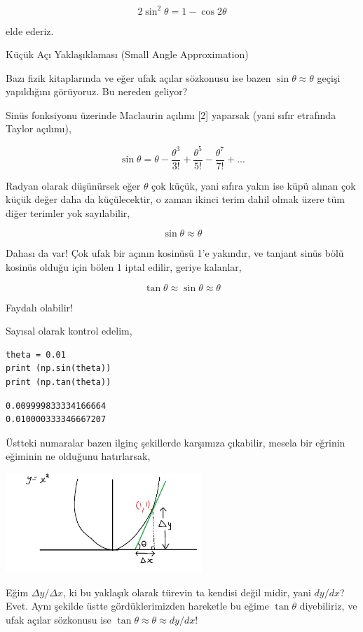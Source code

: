 \documentclass[12pt,fleqn]{article}\usepackage{../../common}
\begin{document}
$$
2\sin^2\theta = 1 - \cos2\theta
$$

elde ederiz.

Küçük Açı Yaklaşıklaması (Small Angle Approximation)

Bazı fizik kitaplarında ve eğer ufak açılar sözkonusu ise bazen $\sin\theta
\approx \theta$ geçişi yapıldığını görüyoruz. Bu nereden geliyor?

Sinüs fonksiyonu üzerinde Maclaurin açılımı [2] yaparsak (yani sıfır etrafında
Taylor açılımı),

$$
\sin\theta =
\theta -
\frac{\theta^3}{3!} +
\frac{\theta^5}{5!} -
\frac{\theta^7}{7!} + ...
$$

Radyan olarak düşünürsek eğer $\theta$ çok küçük, yani sıfıra yakın ise küpü
alınan çok küçük değer daha da küçülecektir, o zaman ikinci terim dahil olmak
üzere tüm diğer terimler yok sayılabilir,

$$
\sin\theta \approx \theta
$$

Dahası da var! Çok ufak bir açının kosinüsü 1'e yakındır, ve tanjant sinüs bölü
kosinüs olduğu için bölen 1 iptal edilir, geriye kalanlar,

$$
\tan\theta \approx \sin\theta \approx \theta
$$

Faydalı olabilir!

Sayısal olarak kontrol edelim,

\begin{verbatim}
theta = 0.01
print (np.sin(theta))
print (np.tan(theta))
\end{verbatim}

\begin{verbatim}
0.009999833334166664
0.010000333346667207
\end{verbatim}

Üstteki numaralar bazen ilginç şekillerde karşımıza çıkabilir, mesela bir
eğrinin eğiminin ne olduğunu hatırlarsak,

\includegraphics[width=20em]{ode_mattuck_50_trig_03.png}

Eğim $\Delta y / \Delta x$, ki bu yaklaşık olarak türevin ta kendisi değil
midir, yani $dy / dx$? Evet. Aynı şekilde üstte gördüklerimizden hareketle
bu eğime $\tan\theta$ diyebiliriz, ve ufak açılar sözkonusu ise
$\tan\theta \approx \theta \approx dy / dx$!
\end{document}
